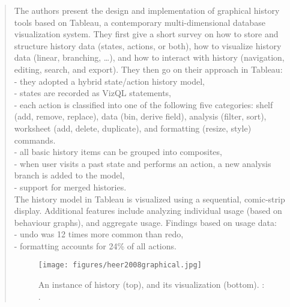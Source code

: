 		\begin{quote}
		\small
		The authors present the design and implementation of graphical history tools based
		on Tableau, a contemporary multi-dimensional database visualization system.
		They first give a short survey on how to store and structure history data (states,
		actions, or both), how to visualize history data (linear, branching, \dots),
		and how to interact with history (navigation, editing, search, and export).
		They then go on their approach in Tableau:\\
		- they adopted a hybrid state/action history model,\\
		- states are recorded as VizQL statements,\\
		- each action is classified into one of the following five categories:
		  shelf (add, remove, replace), data (bin, derive field), analysis (filter, sort),
		  worksheet (add, delete, duplicate), and formatting (resize, style) commands.\\
		- all basic history items can be grouped into composites,\\
		- when user visits a past state and performs an action, a new analysis branch is
		  added to the model,\\
		- support for merged histories.\\
		The history model in Tableau is visualized using a sequential, comic-strip display.
		Additional features include analyzing individual usage (based on behaviour graphs),
		and aggregate usage. Findings based on usage data:\\
		- undo was 12 times more common than redo,\\
		- formatting accounts for 24\% of all actions.  
		\begin{figure}[htb]
		\begin{center}
		\texttt{[image: figures/heer2008graphical.jpg]}
		\caption{
		An instance of history (top), and its visualization (bottom).  
		\citeauthor{heer2008graphical}: 
		\cite{heer2008graphical}.}
		\label{fig:heer2008graphical}
		\end{center}
		\end{figure}

		\end{quote}


		
				
